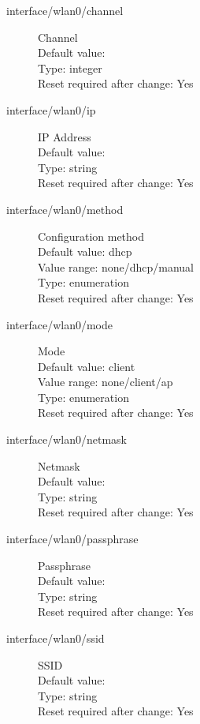 \begin{description}
\item[interface/wlan0/channel] Channel\\
  Default value: \\
  Type: integer\\
  Reset required after change: Yes\\

\item[interface/wlan0/ip] IP Address\\
  Default value: \\
  Type: string\\
  Reset required after change: Yes\\

\item[interface/wlan0/method] Configuration method\\
  Default value: dhcp\\
  Value range: none/dhcp/manual\\
  Type: enumeration\\
  Reset required after change: Yes\\

\item[interface/wlan0/mode] Mode\\
  Default value: client\\
  Value range: none/client/ap\\
  Type: enumeration\\
  Reset required after change: Yes\\

\item[interface/wlan0/netmask] Netmask\\
  Default value: \\
  Type: string\\
  Reset required after change: Yes\\

\item[interface/wlan0/passphrase] Passphrase\\
  Default value: \\
  Type: string\\
  Reset required after change: Yes\\

\item[interface/wlan0/ssid] SSID\\
  Default value: \\
  Type: string\\
  Reset required after change: Yes\\


\end{description}
